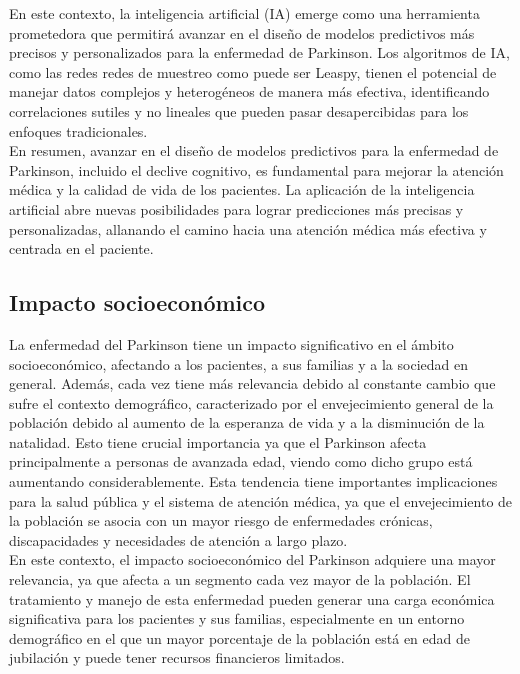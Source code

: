 En este contexto, la inteligencia artificial (IA) emerge como una herramienta prometedora que permitirá avanzar en el diseño de modelos predictivos más precisos y personalizados para la enfermedad de Parkinson. Los algoritmos de IA, como las redes redes de muestreo como puede ser Leaspy,
tienen el potencial de manejar datos complejos y heterogéneos de manera más efectiva, identificando
correlaciones sutiles y no lineales que pueden pasar desapercibidas para los enfoques tradicionales.\\

En resumen, avanzar en el diseño de modelos predictivos para la enfermedad de Parkinson, incluido el
declive cognitivo, es fundamental para mejorar la atención médica y la calidad de vida de los pacientes.
La aplicación de la inteligencia artificial abre nuevas posibilidades para lograr predicciones más precisas
y personalizadas, allanando el camino hacia una atención médica más efectiva y centrada en el paciente.\\

\subsection{Impacto socioeconómico}
La enfermedad del Parkinson tiene un impacto significativo en el ámbito socioeconómico, afectando a los pacientes, a sus familias y a la sociedad en general. Además, cada vez tiene más relevancia debido al constante cambio que sufre el contexto demográfico, caracterizado por el envejecimiento general de la población debido al aumento de la esperanza de vida y a la disminución de la natalidad. Esto tiene crucial importancia ya que el Parkinson afecta principalmente a personas de avanzada edad, viendo como dicho grupo está aumentando considerablemente. Esta tendencia tiene importantes implicaciones para la salud pública y el sistema de atención médica, ya que el envejecimiento de la población se asocia con un mayor riesgo de enfermedades crónicas, discapacidades y necesidades de atención a largo plazo. \cite{GARCIARAMOS2016401}\\

En este contexto, el impacto socioeconómico del Parkinson adquiere una mayor relevancia, ya que afecta a un segmento cada vez mayor de la población. El tratamiento y manejo de esta enfermedad pueden generar una carga económica significativa para los pacientes y sus familias, especialmente en un entorno demográfico en el que un mayor porcentaje de la población está en edad de jubilación y puede tener recursos financieros limitados.\\

